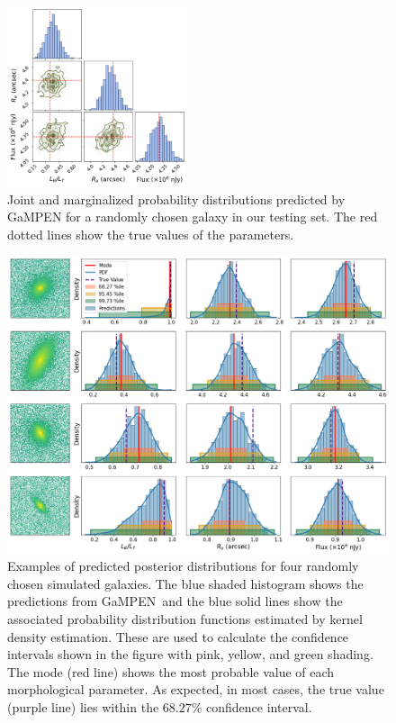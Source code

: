 \documentclass[twocolumn]{aastex63}
\newcommand\gampen{GaMPEN}
\begin{document}
\begin{CJK*}{UTF8}{gbsn}
\begin{figure}[htb]
    \centering
    \includegraphics[width
    =0.47\textwidth]{corner.png}
    \caption{Joint and marginalized probability distributions predicted by \gampen{} for a randomly chosen galaxy in our testing set. The red dotted lines show the true values of the parameters.}
    \label{fig:corner}
\end{figure}

\begin{figure}[htb]
    \centering
    \includegraphics[width
    =\textwidth]{example_predicted_distributions_2.png}
    \caption{Examples of predicted posterior distributions for four randomly chosen simulated galaxies. The blue shaded histogram shows the predictions from \gampen\, and the blue solid lines show the associated probability distribution functions estimated by kernel density estimation. These are used to calculate the confidence intervals shown in the figure with pink, yellow, and green shading. The mode (red line) shows the most probable value of each morphological parameter. As expected, in most cases, the true value (purple line) lies within the $68.27\%$ confidence interval.}
    \label{fig:example_pred_dists}
\end{figure}


\end{CJK*}
\end{document}
